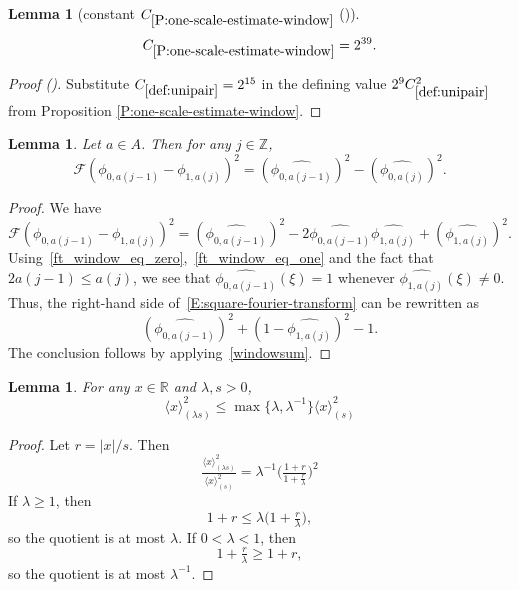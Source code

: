 \documentclass[12pt,reqno]{amsart}
\newcommand{\auto}{{({\tiny\faCar})}}
\theoremstyle{plain}
\newtheorem{lemma}[theorem]{Lemma}
\numberwithin{equation}{section}
\theoremstyle{remark}
\newcommand{\uses}[1]{}
\newcommand{\usesdefs}[1]{}
\newcommand{\Z}{{\mathbb Z}}
\newcommand{\R}{{\mathbb R}}
\begin{document}
\begin{lemma}[constant $C_{\ref{P:one-scale-estimate-window}}$ \auto]\label{auto:constant-one-scale-window}\uses{P:one-scale-estimate-window}\usesdefs{def:unipair}
\begin{equation}\label{auto:constant-one-scale-window-bound}
C_{\ref{P:one-scale-estimate-window}}=2^{39}.
\end{equation}
\end{lemma}
\begin{proof}[Proof \auto]
Substitute $C_{\ref{def:unipair}}=2^{15}$ in the defining value $2^9C_{\ref{def:unipair}}^2$ from Proposition \ref{P:one-scale-estimate-window}.
\end{proof}

\begin{lemma}\label{L:fourier-transform-window}\uses{}\usesdefs{multiplicatively spaced monotone sequences,def:cn-window,def:cpair,def:unipair}
Let $a\in A$. Then for any $j\in \Z$,
\begin{equation}\label{auto:window-square-Fourier-identity}
\mathcal F({\phi}_{0,a(j-1)}-{\phi}_{1,a(j)})^2=
(\widehat{{\phi}_{0,a(j-1)}})^2-(\widehat{{\phi}_{0,a(j)}})^2.
\end{equation}
\end{lemma}

\begin{proof}
We have
\begin{equation}\label{E:square-fourier-transform}
\mathcal F({\phi}_{0,a(j-1)}-{\phi}_{1,a(j)})^2=
(\widehat{{\phi}_{0,a(j-1)}})^2 - 2 \widehat{{\phi}_{0,a(j-1)}} \widehat{{\phi}_{1,a(j)}} +(\widehat{{\phi}_{1,a(j)}})^2.
\end{equation}
Using~\eqref{ft_window_eq_zero},~\eqref{ft_window_eq_one} and the fact that $2a(j-1) \leq a(j)$, we see that $\widehat{{\phi}_{0,a(j-1)}}(\xi)=1$ whenever $\widehat{{\phi}_{1,a(j)}}(\xi) \neq 0$. Thus, the right-hand side of~\eqref{E:square-fourier-transform} can be rewritten as
\[
(\widehat{{\phi}_{0,a(j-1)}})^2 +(1-\widehat{{\phi}_{1,a(j)}})^2-1.
\]
The conclusion follows by applying~\eqref{windowsum}.
\end{proof}

\begin{lemma} \label{lem:scaleest}\uses{}\usesdefs{bracket bump}
    For any $x\in \R$ and $\lambda, s>0$,
    \begin{equation}\label{auto:scaled-bracket-comparison}\langle x \rangle^2_{(\lambda s)} \le \max\{\lambda,\lambda^{-1}\}\langle x \rangle^2_{(s)}\end{equation}
\end{lemma}
\begin{proof}
    Let $r=|x|/s$. Then
    \[\tfrac{\langle x \rangle^2_{(\lambda s)} }{\langle x \rangle^2_{(s)}} = \lambda^{-1}\Big(\tfrac{1+r}{1+\tfrac{r}{\lambda}} \Big)^2\]
    If $\lambda\ge 1$, then
    \[1+r\le \lambda\Big(1+\tfrac{r}{\lambda} \Big),\]
    so the quotient is at most $\lambda$. If $0<\lambda <1$, then
    \[1+\tfrac{r}{\lambda}\ge 1+ r,\]
    so the quotient is at most $\lambda^{-1}$.
\end{proof}
\end{document}
